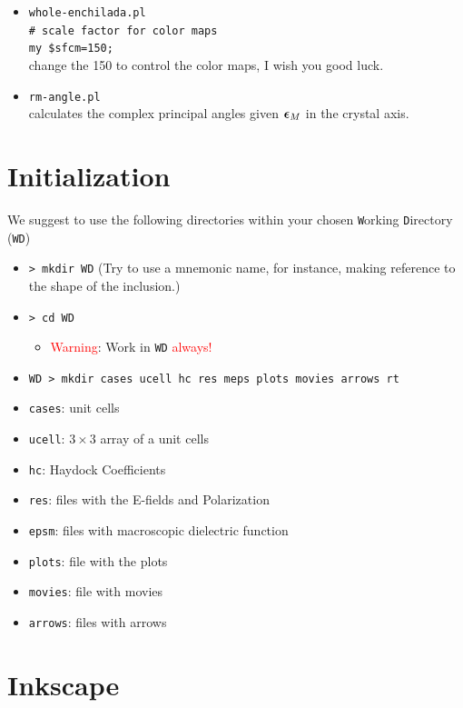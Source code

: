 \documentclass[preprint,12pt]{revtex4}
\def\colore{red}
\begin{document}
\begin{itemize}
\item \verb=whole-enchilada.pl=\\
\verb=# scale factor for color maps=\\
\verb+my $sfcm=150;+\\
change the 150 to control the color maps, I wish you good luck.
\item \verb=rm-angle.pl=\\
calculates the complex principal angles given $\boldsymbol{\epsilon}_M$ in the
crystal axis.
\end{itemize}  

\section{Initialization}

We suggest to use the following directories within your chosen
  \verb=W=orking \verb=D=irectory (\verb=WD=)
\begin{itemize}
\item \verb=> mkdir WD= (Try to use a mnemonic
  name, for instance, making reference to the shape of the inclusion.)  
\item \verb=> cd WD=
\begin{itemize}
\item \textcolor{\colore}{Warning}: Work in \verb=WD= \textcolor{\colore}{always!}
\end{itemize}
\item \verb=WD > mkdir cases ucell hc res meps plots movies arrows rt=
\item \verb=cases=: unit cells
\item \verb=ucell=: $3\times 3$ array of a unit cells
\item \verb=hc=: Haydock Coefficients
\item \verb=res=: files with the E-fields and Polarization
\item \verb=epsm=: files with macroscopic dielectric function
\item \verb=plots=: file with the plots
\item \verb=movies=: file with movies
\item \verb=arrows=: files with arrows
\end{itemize}

\section{Inkscape}\label{sec:ink}
\end{document}
